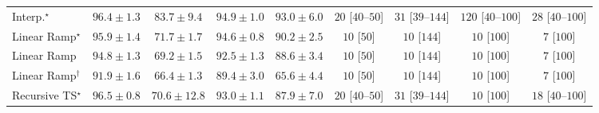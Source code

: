 \begin{tabular}{l|cccc|cccc|}
Interp.$^\star$ & {\cellcolor[HTML]{6E2706}} \color[HTML]{F1F1F1} $96.4\pm 1.3$ & {\cellcolor[HTML]{D95B09}} \color[HTML]{F1F1F1} $83.7\pm 9.4$ & {\cellcolor[HTML]{7C2C05}} \color[HTML]{F1F1F1} $94.9\pm 1.0$ & {\cellcolor[HTML]{8C3004}} \color[HTML]{F1F1F1} $93.0\pm 6.0$ & {\cellcolor[HTML]{FFF3EF}} \color[HTML]{000000} $20$ [$40$--$50$] & {\cellcolor[HTML]{FEF1ED}} \color[HTML]{000000} $31$ [$39$--$144$] & {\cellcolor[HTML]{FDDAD7}} \color[HTML]{000000} $120$ [$40$--$100$] & {\cellcolor[HTML]{FEF1ED}} \color[HTML]{000000} $28$ [$40$--$100$] \\
Linear Ramp$^\star$ & {\cellcolor[HTML]{732905}} \color[HTML]{F1F1F1} $95.9\pm 1.4$ & {\cellcolor[HTML]{FEB13E}} \color[HTML]{000000} $71.7\pm 1.7$ & {\cellcolor[HTML]{7E2C05}} \color[HTML]{F1F1F1} $94.6\pm 0.8$ & {\cellcolor[HTML]{A63A03}} \color[HTML]{F1F1F1} $90.2\pm 2.5$ & {\cellcolor[HTML]{FFF6F2}} \color[HTML]{000000} $10$ [$50$] & {\cellcolor[HTML]{FFF6F2}} \color[HTML]{000000} $10$ [$144$] & {\cellcolor[HTML]{FFF6F2}} \color[HTML]{000000} $10$ [$100$] & {\cellcolor[HTML]{FFF6F2}} \color[HTML]{000000} $7$ [$100$] \\
Linear Ramp & {\cellcolor[HTML]{7C2C05}} \color[HTML]{F1F1F1} $94.8\pm 1.3$ & {\cellcolor[HTML]{FEC550}} \color[HTML]{000000} $69.2\pm 1.5$ & {\cellcolor[HTML]{913204}} \color[HTML]{F1F1F1} $92.5\pm 1.3$ & {\cellcolor[HTML]{B44103}} \color[HTML]{F1F1F1} $88.6\pm 3.4$ & {\cellcolor[HTML]{FFF6F2}} \color[HTML]{000000} $10$ [$50$] & {\cellcolor[HTML]{FFF6F2}} \color[HTML]{000000} $10$ [$144$] & {\cellcolor[HTML]{FFF6F2}} \color[HTML]{000000} $10$ [$100$] & {\cellcolor[HTML]{FFF6F2}} \color[HTML]{000000} $7$ [$100$] \\
Linear Ramp$^\dagger$ & {\cellcolor[HTML]{983404}} \color[HTML]{F1F1F1} $91.9\pm 1.6$ & {\cellcolor[HTML]{FED36F}} \color[HTML]{000000} $66.4\pm 1.3$ & {\cellcolor[HTML]{AE3E03}} \color[HTML]{F1F1F1} $89.4\pm 3.0$ & {\cellcolor[HTML]{FED87A}} \color[HTML]{000000} $65.6\pm 4.4$ & {\cellcolor[HTML]{FFF6F2}} \color[HTML]{000000} $10$ [$50$] & {\cellcolor[HTML]{FFF6F2}} \color[HTML]{000000} $10$ [$144$] & {\cellcolor[HTML]{FFF6F2}} \color[HTML]{000000} $10$ [$100$] & {\cellcolor[HTML]{FFF6F2}} \color[HTML]{000000} $7$ [$100$] \\
Recursive TS$^\star$ & {\cellcolor[HTML]{6E2706}} \color[HTML]{F1F1F1} $96.5\pm 0.8$ & {\cellcolor[HTML]{FEBA46}} \color[HTML]{000000} $70.6\pm 12.8$ & {\cellcolor[HTML]{8C3004}} \color[HTML]{F1F1F1} $93.0\pm 1.1$ & {\cellcolor[HTML]{BB4403}} \color[HTML]{F1F1F1} $87.9\pm 7.0$ & {\cellcolor[HTML]{FFF3EF}} \color[HTML]{000000} $20$ [$40$--$50$] & {\cellcolor[HTML]{FEF1ED}} \color[HTML]{000000} $31$ [$39$--$144$] & {\cellcolor[HTML]{FFF6F2}} \color[HTML]{000000} $10$ [$100$] & {\cellcolor[HTML]{FFF3F0}} \color[HTML]{000000} $18$ [$40$--$100$] \\

\end{tabular}
